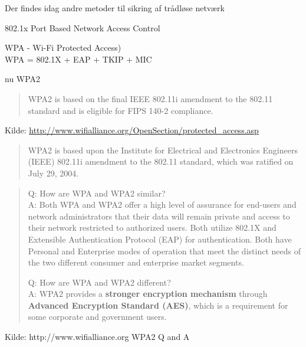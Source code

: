 \begin{list1}
\item Der findes idag andre metoder til sikring af trådløse netværk
\item 802.1x Port Based Network Access Control 
\item WPA - Wi-Fi Protected Access)\\
WPA = 802.1X + EAP + TKIP + MIC
\item nu WPA2
\begin{quote}
WPA2 is based on the final IEEE 802.11i amendment to the 802.11
standard and is eligible for FIPS 140-2 compliance.
\end{quote}
\item Kilde: 
\href{http://www.wifialliance.org/OpenSection/protected_access.asp}
{http://www.wifialliance.org/OpenSection/protected\_access.asp}
\end{list1}


\begin{quote}
WPA2 is based upon the Institute for Electrical and Electronics
Engineers (IEEE) 802.11i amendment to the 802.11 standard, which was
ratified on July 29, 2004.  
\end{quote}

\begin{quote}
Q: How are WPA and WPA2 similar?\\
A: Both WPA and WPA2 offer a high level of assurance for end-users and network
administrators that their data will remain private and access to their
network restricted to authorized users.
Both utilize 802.1X and Extensible Authentication Protocol (EAP) for
authentication. Both have Personal and Enterprise modes of operation
that meet the distinct needs of the two different consumer and
enterprise market segments. 

Q: How are WPA and WPA2 different?\\
A: WPA2 provides a {\bf stronger encryption mechanism} through {\bf
  Advanced Encryption Standard (AES)}, which is a requirement for some
corporate and government users. 
\end{quote}

\centerline{Kilde: http://www.wifialliance.org WPA2 Q and A}


